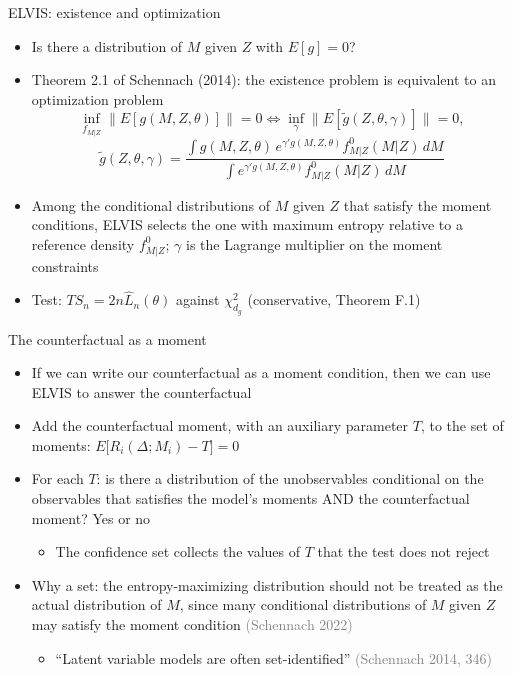 \documentclass[
  ignorenonframetext,
  aspectratio=169,
]{beamer}
\providecommand{\tightlist}{%
  \setlength{\itemsep}{0pt}\setlength{\parskip}{0pt}}
\newcommand{\sm}[1]{\textcolor{gray}{\footnotesize #1}} %
\begin{document}
\begin{frame}{ELVIS: existence and optimization}
\protect{}\label{elvis-existence-and-optimization}
\begin{itemize}
\tightlist
\item
  Is there a distribution of \(M\) given \(Z\) with \(E[g]=0\)?
\item
  Theorem 2.1 of Schennach (2014): the existence problem is equivalent
  to an optimization problem \[
  \inf_{f_{M|Z}}\big\|E[g(M,Z,\theta)]\big\|=0\iff\inf_{\gamma}\big\|E[\tilde g(Z,\theta,\gamma)]\big\|=0,
  \] \[
  \tilde g(Z,\theta,\gamma)=\frac{\int g(M,Z,\theta)\,e^{\gamma'g(M,Z,\theta)}f^0_{M|Z}(M|Z)\,dM}{\int e^{\gamma'g(M,Z,\theta)}f^0_{M|Z}(M|Z)\,dM}
  \]
\item
  Among the conditional distributions of \(M\) given \(Z\) that satisfy
  the moment conditions, ELVIS selects the one with maximum entropy
  relative to a reference density \(f^0_{M|Z}\); \(\gamma\) is the
  Lagrange multiplier on the moment constraints
\item
  Test: \(TS_n=2n\hat L_n(\theta)\) against \(\chi^2_{d_g}\)
  (conservative, Theorem F.1)
\end{itemize}
\end{frame}

\begin{frame}{The counterfactual as a moment}
\protect{}\label{the-counterfactual-as-a-moment}
\begin{itemize}
\tightlist
\item
  If we can write our counterfactual as a moment condition, then we can
  use ELVIS to answer the counterfactual
\item
  Add the counterfactual moment, with an auxiliary parameter \(T\), to
  the set of moments: \(E\big[R_i(\Delta;M_i)-T\big]=0\)
\item
  For each \(T\): is there a distribution of the unobservables
  conditional on the observables that satisfies the model's moments AND
  the counterfactual moment? Yes or no

  \begin{itemize}
  \tightlist
  \item
    The confidence set collects the values of \(T\) that the test does
    not reject
  \end{itemize}
\item
  Why a set: the entropy-maximizing distribution should not be treated
  as the actual distribution of \(M\), since many conditional
  distributions of \(M\) given \(Z\) may satisfy the moment condition
  \sm{(Schennach 2022)}

  \begin{itemize}
  \tightlist
  \item
    ``Latent variable models are often set-identified'' \sm{(Schennach
    2014, 346)}
  \end{itemize}
\end{itemize}
\end{frame}
\end{document}
